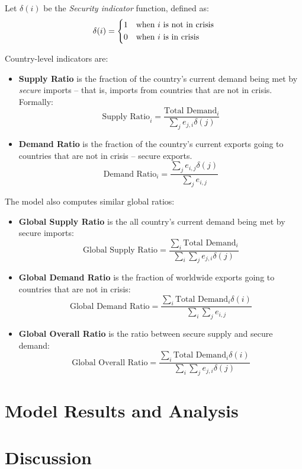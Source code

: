 \documentclass{article}
\begin{document}
Let $\delta(i)$ be the \emph{Security indicator} function, defined as:
\[
\delta(i) = \begin{dcases*}
	1 & when $i$ is not in crisis\\
	0 & when $i$ is in crisis
\end{dcases*}
\]

Country-level indicators are:

\begin{itemize}
	\item \textbf{Supply Ratio} is the fraction of the country's current demand being met by \emph{secure} imports -- that is, imports from countries that are not in crisis. Formally:
	$$
		\text{Supply Ratio}_i = \frac{\text{Total Demand}_i}{\sum_{j}e_{j,i}\delta(j)}
	$$
\item \textbf{Demand Ratio} is the fraction of the country's current exports going to countries that are not in crisis -- secure exports. 
$$
\text{Demand Ratio}_i = \frac{\sum_{j}e_{i,j}\delta(j)}{\sum_{j}e_{i,j}}
$$
\end{itemize}

The model also computes similar global ratios:
\begin{itemize}
	\item \textbf{Global Supply Ratio} is the all country's current demand being met by secure imports:
	$$
		\text{Global Supply Ratio} = \frac{\sum_i\text{Total Demand}_i}{\sum_i\sum_{j}e_{j,i}\delta(j)}
	$$
	\item \textbf{Global Demand Ratio} is the fraction of worldwide exports going to countries that are not in crisis:
	$$
		\text{Global Demand Ratio} = \frac{\sum_i \text{Total Demand}_i\delta(i)}{\sum_i\sum_{j}e_{i,j}}
	$$
	\item \textbf{Global Overall Ratio} is the ratio between secure supply and secure demand:
	$$
		\text{Global Overall Ratio} = \frac{\sum_i \text{Total Demand}_i\delta(i)}{\sum_i\sum_{j}e_{j,i}\delta(j)}
	$$
\end{itemize}


\section{Model Results and Analysis}

\section{Discussion}
\end{document}
